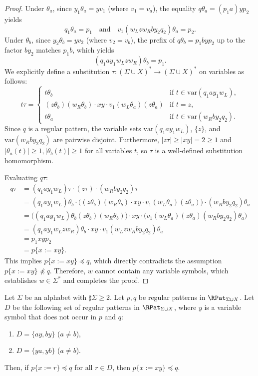 {\begin{proof}
Under $\theta_a$, since $y_1\theta_a = y v_1$ (where $v_1 = v_a$), the equality $q\theta_a = (p_1 a) y p_2$ yields
\[
q_1\theta_a = p_1 \quad \text{and} \quad v_1 (w_L z w_R b y_2 q_2)\theta_a = p_2.
\]
Under $\theta_b$, since $y_2\theta_b = y v_2$ (where $v_2 = v_b$), the prefix of $q\theta_b = p_1 b y p_2$ up to the factor $b y_2$ matches $p_1 b$, which yields
\[
(q_1 a y_1 w_L z w_R)\theta_b = p_1.
\]
We explicitly define a substitution $\tau \colon (\Sigma \cup X)^* \to (\Sigma \cup X)^*$ on variables as follows:
\[
t\tau = 
\begin{cases}
t\theta_b & \text{if } t \in \mathrm{var}(q_1 a y_1 w_L), \\
(z\theta_b)(w_R\theta_b) \cdot x y \cdot v_1 (w_L\theta_a)(z\theta_a) & \text{if } t = z, \\
t\theta_a & \text{if } t \in \mathrm{var}(w_R b y_2 q_2).
\end{cases}
\]
Since $q$ is a regular pattern, the variable sets $\mathrm{var}(q_1 a y_1 w_L)$, $\{z\}$, and $\mathrm{var}(w_R b y_2 q_2)$ are pairwise disjoint.
Furthermore, $|z\tau| \ge |xy| = 2 \ge 1$ and $|\theta_a(t)| \ge 1, |\theta_b(t)| \ge 1$ for all variables $t$, so $\tau$ is a well-defined substitution homomorphism.

Evaluating $q\tau$:
\begin{align*}
q\tau &= (q_1 a y_1 w_L)\tau \cdot (z\tau) \cdot (w_R b y_2 q_2)\tau \\
      &= (q_1 a y_1 w_L)\theta_b \cdot \Big( (z\theta_b)(w_R\theta_b) \cdot x y \cdot v_1(w_L\theta_a)(z\theta_a) \Big) \cdot (w_R b y_2 q_2)\theta_a \\
      &= \Big( (q_1 a y_1 w_L)\theta_b (z\theta_b) (w_R\theta_b) \Big) \cdot x y \cdot \Big( v_1 (w_L\theta_a)(z\theta_a) (w_R b y_2 q_2)\theta_a \Big) \\
      &= (q_1 a y_1 w_L z w_R)\theta_b \cdot x y \cdot v_1 (w_L z w_R b y_2 q_2)\theta_a \\
      &= p_1 x y p_2 \\
      &= p\{x := xy\}.
\end{align*}
This implies $p\{x := xy\} \preceq q$, which directly contradicts the assumption $p\{x := xy\} \not\preceq q$.
Therefore, $w$ cannot contain any variable symbols, which establishes $w \in \Sigma^*$ and completes the proof.
\end{proof}
  }

\begin{lem}\label{lem:twovariables}
{\color{black}Let $\Sigma$ be an alphabet with $\sharp\Sigma \ge 2$}.
Let $p,q$ be regular patterns in {\color{black}$\RPat_{\Sigma\cup X}$}.
Let $D$ be the following set of regular patterns in $\RPat_{\Sigma\cup X}$, where $y$ is a variable symbol that does not occur in $p$ and $q$:
\begin{enumerate}
\item[{\rm (i)}] $D=\{ ay, by \}$ ($a \not= b$),
\item[{\rm (ii)}] $D=\{ ya, yb \}$ ($a \not= b$).
\end{enumerate}
Then, if $p \{ x := r \} \preceq q$ for all $r \in D$, then $p \{ x := xy \} \preceq q$.
\end{lem}

